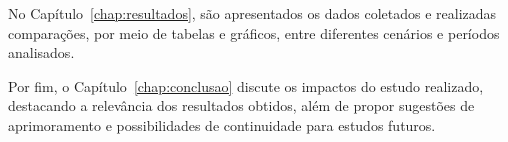 		No Capítulo~\ref{chap:resultados}, são apresentados os dados coletados e realizadas comparações, por meio de tabelas e gráficos, entre diferentes cenários e períodos analisados.

		Por fim, o Capítulo~\ref{chap:conclusao} discute os impactos do estudo realizado, destacando a relevância dos resultados obtidos, além de propor sugestões de aprimoramento e possibilidades de continuidade para estudos futuros.

		
